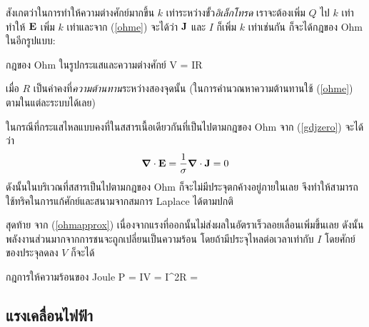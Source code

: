 สังเกตว่าในการทำให้ความต่างศักย์มากขึ้น $k$ เท่าระหว่างขั้ว\emph{อิเล็กโทรด} เราจะต้องเพิ่ม $Q$ ไป $k$ เท่า ทำให้ $\mathbf{E}$ เพิ่ม $k$ เท่าและจาก (\ref{ohme}) จะได้ว่า $\mathbf{J}$ และ $I$ ก็เพิ่ม $k$ เท่าเช่นกัน ก็จะได้กฎของ Ohm ในอีกรูปแบบ:
\begin{ieqbox}{กฎของ Ohm ในรูปกระแสและความต่างศักย์} 
    V = IR 
\end{ieqbox}
เมื่อ $R$ เป็นค่าคงที่\emph{ความต้านทาน}ระหว่างสองจุดนั้น (ในการคำนวณหาความต้านทานใช้ (\ref{ohme}) ตามในแต่ละระบบได้เลย)

ในกรณีที่กระแสไหลแบบคงที่ในสสารเนื้อเดียวกันที่เป็นไปตามกฎของ Ohm จาก (\ref{gdjzero}) จะได้ว่า
\begin{equation} 
    \boldsymbol{\nabla}\cdot\mathbf{E} = \frac{1}{\sigma}\boldsymbol{\nabla}\cdot\mathbf{J} = 0 
\end{equation}
ดังนั้นในบริเวณที่สสารเป็นไปตามกฎของ Ohm ก็จะไม่มีประจุตกค้างอยู่ภายในเลย จึงทำให้สามารถใช้ทริคในการแก้ศักย์และสนามจากสมการ Laplace ได้ตามปกติ

สุดท้าย จาก (\ref{ohmapprox}) เนื่องจากแรงที่ออกนั้นไม่ส่งผลในอัตราเร็วลอยเลื่อนเพิ่มขึ้นเลย ดังนั้นพลังงานส่วนมากจากการชนจะถูกเปลี่ยนเป็นความร้อน โดยถ้ามีประจุไหลต่อเวลาเท่ากับ $I$ โดยศักย์ของประจุลดลง $V$ ก็จะได้
\begin{ieqbox}{กฎการให้ความร้อนของ Joule} 
    P = IV = I^2R =  
\end{ieqbox}

\subsection{แรงเคลื่อนไฟฟ้า}

